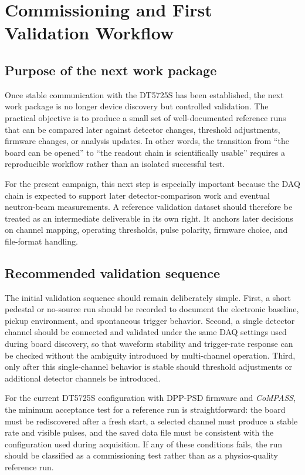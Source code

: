 \chapter{Commissioning and First Validation Workflow}

\section{Purpose of the next work package}

Once stable communication with the DT5725S has been established, the next work package is no longer device discovery but controlled validation. The practical objective is to produce a small set of well-documented reference runs that can be compared later against detector changes, threshold adjustments, firmware changes, or analysis updates. In other words, the transition from ``the board can be opened'' to ``the readout chain is scientifically usable'' requires a reproducible workflow rather than an isolated successful test.

For the present campaign, this next step is especially important because the DAQ chain is expected to support later detector-comparison work and eventual neutron-beam measurements. A reference validation dataset should therefore be treated as an intermediate deliverable in its own right. It anchors later decisions on channel mapping, operating thresholds, pulse polarity, firmware choice, and file-format handling.

\section{Recommended validation sequence}

The initial validation sequence should remain deliberately simple. First, a short pedestal or no-source run should be recorded to document the electronic baseline, pickup environment, and spontaneous trigger behavior. Second, a single detector channel should be connected and validated under the same DAQ settings used during board discovery, so that waveform stability and trigger-rate response can be checked without the ambiguity introduced by multi-channel operation. Third, only after this single-channel behavior is stable should threshold adjustments or additional detector channels be introduced.

For the current DT5725S configuration with DPP-PSD firmware and \textit{CoMPASS}, the minimum acceptance test for a reference run is straightforward: the board must be rediscovered after a fresh start, a selected channel must produce a stable rate and visible pulses, and the saved data file must be consistent with the configuration used during acquisition. If any of these conditions fails, the run should be classified as a commissioning test rather than as a physics-quality reference run.

